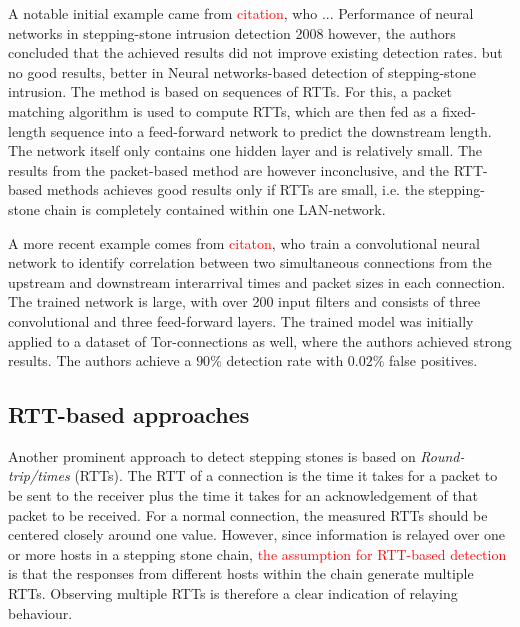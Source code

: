 \documentclass[runningheads]{llncs}\usepackage[]{graphicx}\usepackage[]{color}
\begin{document}
A notable initial example came from \textcolor{red}{citation}, who ...
Performance of neural networks in stepping-stone intrusion detection 2008
however, the authors concluded that the achieved results did not improve existing detection rates. but no good results, better in Neural  networks-based  detection  of stepping-stone  intrusion.
The method is based on sequences of RTTs. For this, a packet matching algorithm is used to compute RTTs, which are then fed as a fixed-length sequence into a feed-forward network to predict the downstream length. The network itself only contains one hidden layer and is relatively small. The results from the packet-based method are however inconclusive, and the RTT-based methods achieves good results only if RTTs are small, i.e. the stepping-stone chain is completely contained within one LAN-network.






A more recent example comes from \textcolor{red}{citaton}, who train a convolutional neural network to identify correlation between two simultaneous connections from the upstream and downstream interarrival times and packet sizes in each connection. The trained network is large, with over 200 input filters and consists of three convolutional and three feed-forward layers. The trained model was initially applied to a dataset of Tor-connections as well, where the authors achieved strong results. 
The authors achieve a $90\%$ detection rate with $0.02 \%$ false positives. 


\subsection{RTT-based approaches}

Another prominent approach to detect stepping stones is based on \textit{Round-trip/times} (RTTs). The RTT of a connection is the time it takes for a packet to be sent to the receiver plus the time it takes for an acknowledgement of that packet to be received. For a normal connection, the measured RTTs should be centered closely around one value. However, since information is relayed over one or more hosts in a stepping stone chain, \textcolor{red}{the assumption for RTT-based detection} is that the responses from different hosts within the chain generate multiple RTTs. Observing multiple RTTs is therefore a clear indication of relaying behaviour.
\end{document}
